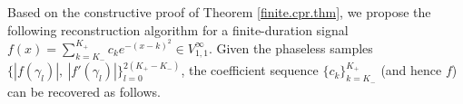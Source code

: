 \documentclass[11pt,oneside,reqno]{amsart}
\numberwithin{equation}{section}
\begin{document}
%
%


\medskip 

Based on the constructive proof of Theorem \ref{finite.cpr.thm}, we propose the following reconstruction algorithm for a finite-duration signal $f(x)=\sum_{k=K_-}^{K_+} c_k e^{-(x-k)^2}\in V^{\infty}_{1,1}$.  Given the phaseless samples $
\big\{|f(\gamma_l)|,\ |f'(\gamma_l)|\big\}_{l=0}^{2(K_+-K_-)}$, 
the coefficient sequence
$\{c_k\}_{k=K_-}^{K_+}$ (and hence $f$) can be recovered as follows.
\end{document}
